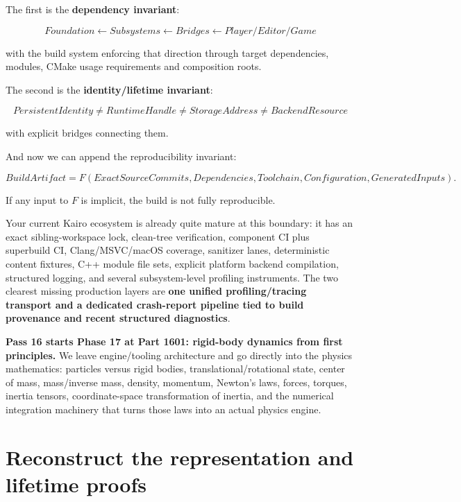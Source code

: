 The first is the \textbf{dependency invariant}:

\[
\boxed{
Foundation
\leftarrow
Subsystems
\leftarrow
Bridges
\leftarrow
Player/Editor/Game
}
\]

with the build system enforcing that direction through target dependencies, modules, CMake usage requirements and composition roots.

The second is the \textbf{identity/lifetime invariant}:

\[
\boxed{
PersistentIdentity
\neq
RuntimeHandle
\neq
StorageAddress
\neq
BackendResource
}
\]

with explicit bridges connecting them.

And now we can append the reproducibility invariant:

\[
\boxed{
BuildArtifact
=
F(
ExactSourceCommits,
Dependencies,
Toolchain,
Configuration,
GeneratedInputs
).
}
\]

If any input to \(F\) is implicit, the build is not fully reproducible.

Your current Kairo ecosystem is already quite mature at this boundary: it has an exact sibling-workspace lock, clean-tree verification, component CI plus superbuild CI, Clang/MSVC/macOS coverage, sanitizer lanes, deterministic content fixtures, C++ module file sets, explicit platform backend compilation, structured logging, and several subsystem-level profiling instruments. The two clearest missing production layers are \textbf{one unified profiling/tracing transport and a dedicated crash-report pipeline tied to build provenance and recent structured diagnostics}.

\textbf{Pass 16 starts Phase 17 at Part 1601: rigid-body dynamics from first principles.} We leave engine/tooling architecture and go directly into the physics mathematics: particles versus rigid bodies, translational/rotational state, center of mass, mass/inverse mass, density, momentum, Newton's laws, forces, torques, inertia tensors, coordinate-space transformation of inertia, and the numerical integration machinery that turns those laws into an actual physics engine.

\section{Reconstruct the representation and lifetime proofs}\label{01-foundations-i-ch010-reconstruct-the-representation-and-lifetime-proofs}

\hypertarget{01-foundations-i-ch010-reconstruct-the-representation-and-lifetime-proofs}{}

